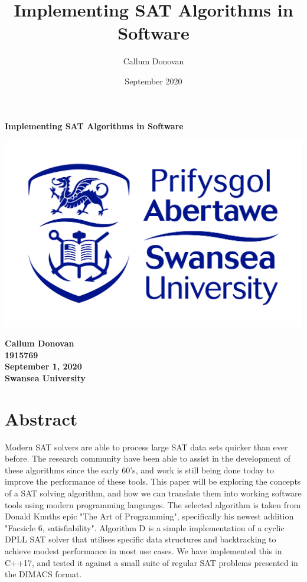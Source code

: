 \documentclass{article}
\title{\bfseries Implementing SAT Algorithms in Software}
\author{Callum Donovan}
\date{September 2020}
\begin{document}
\begin{titlepage}
    \begin{center}
        \Large{\bfseries Implementing SAT Algorithms in Software} \\
        \vspace{4cm}
        \begin{center}
            \includegraphics[scale=0.2]{swan.jpg}
        \end{center}
        \vspace*{\fill}
        \bfseries{\large Callum Donovan \\
            1915769 \\
            September 1, 2020 \\
            Swansea University \\}
    \end{center}
\end{titlepage}

\section{Abstract}
Modern SAT solvers are able to process large SAT data sets quicker than ever before. The research community have been able to assist in the
development of these algorithms since the early 60's, and work is still being done today to improve the performance of these tools. This
paper will be exploring the concepts of a SAT solving algorithm, and how we can translate them into working software tools using modern
programming languages. The selected algorithm is taken from Donald Knuths epic "The Art of Programming", specifically his newest addition "Facsicle 6,
satisfiability". Algorithm D is a simple implementation of a cyclic DPLL SAT solver that utilises specific data structures and backtracking to achieve
modest performance in most use cases. We have implemented this in C++17, and tested it against a small suite of regular SAT problems presented in the DIMACS
format.
\end{document}
